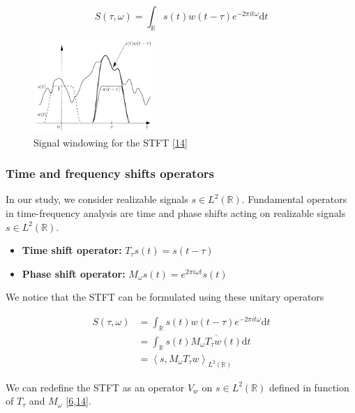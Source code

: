\documentclass[american,]{article}
\providecommand{\tightlist}{%
  \setlength{\itemsep}{0pt}\setlength{\parskip}{0pt}}
\theoremstyle{definition}
\theoremstyle{definition}
\theoremstyle{definition}
\theoremstyle{remark}
\begin{document}
\begin{equation}
S(\tau,\omega) = \int_\mathbb{R}s(t)w(t-\tau)e^{-2\pi it\omega} \mathrm{d}t
\end{equation}

\begin{figure}
\centering
\includegraphics[width=0.4\textwidth,height=\textheight]{img/stft_grochenig.png}
\caption{Signal windowing for the STFT {[}\protect\hyperlink{ref-grochenig2001}{14}{]}}
\end{figure}

\hypertarget{time-and-frequency-shifts-operators}{%
\subsubsection{Time and frequency shifts operators}\label{time-and-frequency-shifts-operators}}

In our study, we consider realizable signals \(s\in L^2(\mathbb{R})\).
Fundamental operators in time-frequency analysis are
time and phase shifts acting on realizable signals \(s\in L^2(\mathbb{R})\).

\begin{itemize}
\tightlist
\item
  \textbf{Time shift operator:} \(T_\tau s(t)=s(t-\tau)\)
\item
  \textbf{Phase shift operator:} \(M_\omega s(t)=e^{2\pi i \omega t} s(t)\)
\end{itemize}

We notice that the STFT can be formulated using these unitary operators

\begin{align}
S(\tau,\omega) &= \int_\mathbb{R}s(t)w(t-\tau)e^{-2\pi it\omega} \mathrm{d}t\\
    &= \int_\mathbb{R}s(t) \overline{M_\omega T_\tau w(t)} \mathrm{d}t\\
    &= \left\langle s, M_\omega T_\tau w\right\rangle_{L^2(\mathbb{R})}
\end{align}

We can redefine the STFT as an operator \(V_w\) on \(s\in L^2(\mathbb{R})\)
defined in function of \(T_\tau\) and \(M_\omega\) {[}\protect\hyperlink{ref-boscain2021}{6},\protect\hyperlink{ref-grochenig2001}{14}{]}.
\end{document}
